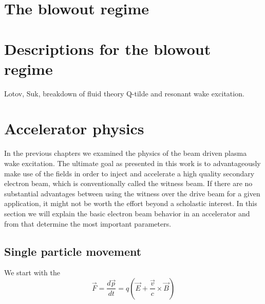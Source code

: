 \section{The blowout regime}

\section{Descriptions for the blowout regime}
Lotov, Suk, breakdown of fluid theory
Q-tilde and resonant wake excitation.


\section{Accelerator physics}
In the previous chapters we examined the physics of the beam driven plasma wake excitation. 
The ultimate goal as presented in this work is to advantageously make use of the fields in order to inject and accelerate a high quality secondary electron beam, which is conventionally called the witness beam. If there are no substantial advantages between  using the witness over the drive beam for a given application, it might not be worth the effort beyond a scholastic interest.
In this section we will explain the basic electron beam behavior in an accelerator and from that determine the most important parameters. 
\subsection{Single particle movement}

We start with the 
\begin{equation}
\vec{F}=\frac{d\vec{p}}{dt}=q(\vec{E}+\frac{\vec{v}}{c}\times\vec{B})
\end{equation}

